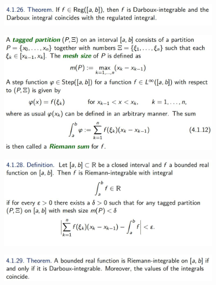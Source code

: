\documentclass{beamer}
\begin{document}
\begin{frame}
    \begin{figure}[htbp]
        \centering
        \includegraphics[width=12cm]{pic13.png}
    \end{figure}
    \begin{figure}[htbp]
        \centering
        \includegraphics[width=12cm]{pic14.png}
    \end{figure}
\end{frame}

\begin{frame}
    \begin{figure}[htbp]
        \centering
        \includegraphics[width=12cm]{pic15.png}
    \end{figure}
    \begin{figure}[htbp]
        \centering
        \includegraphics[width=12cm]{pic16.png}
    \end{figure}
\end{frame}
\end{document}
